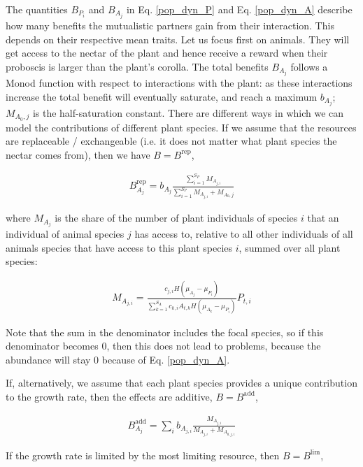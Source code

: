\documentclass[a4paper,12pt]{article}
\begin{document}
The quantities $B_{P_i}$ and $B_{A_j}$ in Eq. \ref{pop_dyn_P} and Eq. \ref{pop_dyn_A} describe how many benefits the mutualistic partners gain from their interaction. This depends on their respective mean traits. Let us focus first on animals. They will get access to the nectar of the plant and hence receive a reward when their proboscis is larger than the plant's corolla. The total benefits $B_{A_j}$ follows a Monod function with respect to interactions with the plant: as these interactions increase the total benefit will eventually saturate, and reach a maximum $b_{A_j}$; $M_{A_0,j}$ is the half-saturation constant. There are different ways in which we can model the contributions of different plant species. If we assume that the resources are replaceable / exchangeable (i.e. it does not matter what plant species the nectar comes from), then we have $B = B^\mathrm{rep}$,

\begin{align}
B^\mathrm{rep}_{A_j} = b_{A_j} \frac{\sum^{S_P}_{i = 1} M_{A_{j,i}}}{\sum^{S_P}_{i = 1} M_{A_{j,i}} + M_{A_0,j}}
\end{align}

\noindent where $M_{A_j}$ is the share of the number of plant individuals of species $i$ that an individual of animal species $j$ has access to, relative to all other individuals of all animals species that have access to this plant species $i$, summed over all plant species:

\begin{align}
    M_{A_{j,i}} =  \frac{c_{j,i} H(\mu_{A_j} - \mu_{P_i}) }{\sum^{S_A}_{k = 1} c_{k,i} A_{t,k} H(\mu_{A_k} - \mu_{P_i}) } P_{t,i}
\end{align}

\noindent Note that the sum in the denominator includes the focal species, so if this denominator becomes 0, then this does not lead to problems, because the abundance will stay 0 because of Eq. \ref{pop_dyn_A}.

\noindent If, alternatively, we assume that each plant species provides a unique contribution to the growth rate, then the effects are additive, $B = B^\mathrm{add}$,

\begin{align}
B^\mathrm{add}_{A_j} = \sum_i b_{A_{j,i}} \frac{M_{A_{j,i}}}{M_{A_{j,i}} + M_{A_{0,j,i}}}
\end{align}

\noindent If the growth rate is limited by the most limiting resource, then $B = B^\mathrm{lim}$,
\end{document}
